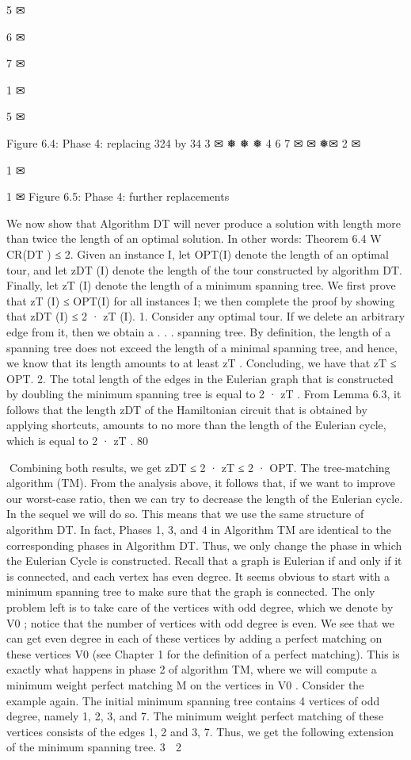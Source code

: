 5
✉

6
✉

7
✉

1 ✉

5
✉

Figure 6.4: Phase 4: replacing 324 by 34
3 ✉
❅
❅
❅ 4
6
7
✉
✉
❅✉
2 ✉

1 ✉

1 ✉
Figure 6.5: Phase 4: further replacements

We now show that Algorithm DT will never produce a solution with length more than twice the length
of an optimal solution. In other words:
Theorem 6.4 W CR(DT ) ≤ 2.
Given an instance I, let OPT(I) denote the length of an optimal tour, and let zDT (I) denote the length
of the tour constructed by algorithm DT. Finally, let zT (I) denote the length of a minimum spanning
tree. We first prove that zT (I) ≤ OPT(I) for all instances I; we then complete the proof by showing
that zDT (I) ≤ 2 · zT (I).
1. Consider any optimal tour. If we delete an arbitrary edge from it, then we obtain a . . . spanning tree.
By definition, the length of a spanning tree does not exceed the length of a minimal spanning tree,
and hence, we know that its length amounts to at least zT . Concluding, we have that zT ≤ OPT.
2. The total length of the edges in the Eulerian graph that is constructed by doubling the minimum
spanning tree is equal to 2 · zT . From Lemma 6.3, it follows that the length zDT of the Hamiltonian
circuit that is obtained by applying shortcuts, amounts to no more than the length of the Eulerian
cycle, which is equal to 2 · zT .
80

Combining both results, we get zDT ≤ 2 · zT ≤ 2 · OPT.
The tree-matching algorithm (TM).
From the analysis above, it follows that, if we want to improve our worst-case ratio, then we can try to
decrease the length of the Eulerian cycle. In the sequel we will do so. This means that we use the same
structure of algorithm DT. In fact, Phases 1, 3, and 4 in Algorithm TM are identical to the corresponding
phases in Algorithm DT. Thus, we only change the phase in which the Eulerian Cycle is constructed.
Recall that a graph is Eulerian if and only if it is connected, and each vertex has even degree. It seems
obvious to start with a minimum spanning tree to make sure that the graph is connected. The only
problem left is to take care of the vertices with odd degree, which we denote by V0 ; notice that the
number of vertices with odd degree is even. We see that we can get even degree in each of these vertices
by adding a perfect matching on these vertices V0 (see Chapter 1 for the definition of a perfect matching).
This is exactly what happens in phase 2 of algorithm TM, where we will compute a minimum weight
perfect matching M on the vertices in V0 .
Consider the example again. The initial minimum spanning tree contains 4 vertices of odd degree, namely
1, 2, 3, and 7. The minimum weight perfect matching of these vertices consists of the edges {1, 2} and
{3, 7}. Thus, we get the following extension of the minimum spanning tree.
3 ✉
2 ✉


